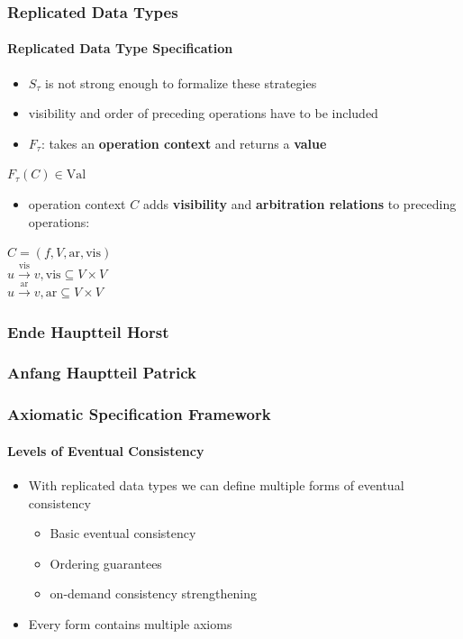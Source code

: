 \documentclass[11pt]{beamer}
\begin{document}
\begin{frame}
\frametitle{Replicated Data Types}
\framesubtitle{Replicated Data Type Specification}
\begin{itemize}
\item \(S_{\tau}\) is not strong enough to formalize these strategies
\pause
\item visibility and order of preceding operations have to be included
\pause
\item \(F_\tau\): takes an \textbf{operation context} and returns a \textbf{value}
\end{itemize}

\begin{center}
\(F_\tau(C) \in \mathrm{Val}\) \\
\end{center}
\pause
\begin{itemize}
\item operation context \(C\) adds \textbf{visibility} and \textbf{arbitration relations} to preceding operations:
\end{itemize}

\begin{center}
\(C = (f, V, \mathrm{ar}, \mathrm{vis})\) \\
\pause
\(u \xrightarrow{\mathrm{vis}} v, \mathrm{vis} \subseteq V \times V  \) \\
\pause
\(u \xrightarrow{\mathrm{ar}} v, \mathrm{ar} \subseteq V \times V  \)
\end{center}

\end{frame}


\begin{frame}

\end{frame}

\begin{frame}
\frametitle{Ende Hauptteil Horst}
\end{frame}

\begin{frame}
\frametitle{Anfang Hauptteil Patrick}
\end{frame}

\begin{frame}
\frametitle{Axiomatic Specification Framework}
\framesubtitle{Levels of Eventual Consistency}
\begin{itemize}
\item With replicated data types we can define multiple forms of eventual consistency
\begin{itemize}
\item Basic eventual consistency
\item Ordering guarantees
\item on-demand consistency strengthening
\end{itemize}
\item Every form contains multiple axioms
\end{itemize}
\end{frame}
\end{document}
